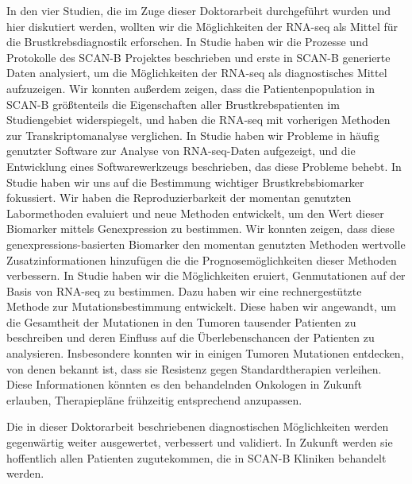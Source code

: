 \documentclass[11pt]{book}
\begin{document}
In den vier Studien, die im Zuge dieser Doktorarbeit durchgeführt wurden und hier diskutiert werden, wollten wir die Möglichkeiten der RNA-seq als Mittel für die Brustkrebsdiagnostik erforschen. In Studie \I haben wir die Prozesse und Protokolle des SCAN-B Projektes beschrieben und erste in SCAN-B generierte Daten analysiert, um die Möglichkeiten der RNA-seq als diagnostisches Mittel aufzuzeigen. Wir konnten außerdem zeigen, dass die Patientenpopulation in SCAN-B größtenteils die Eigenschaften aller Brustkrebspatienten im Studiengebiet widerspiegelt, und haben die RNA-seq mit vorherigen Methoden zur Transkriptomanalyse verglichen. In Studie \II haben wir Probleme in häufig genutzter Software zur Analyse von RNA-seq-Daten aufgezeigt, und die Entwicklung eines Softwarewerkzeugs beschrieben, das diese Probleme behebt. In Studie \III haben wir uns auf die Bestimmung wichtiger Brustkrebsbiomarker fokussiert. Wir haben die Reproduzierbarkeit der momentan genutzten Labormethoden evaluiert und neue Methoden entwickelt, um den Wert dieser Biomarker mittels Genexpression zu bestimmen. Wir konnten zeigen, dass diese genexpressions-basierten Biomarker den momentan genutzten Methoden wertvolle Zusatzinformationen hinzufügen die die Prognosemöglichkeiten dieser Methoden verbessern. In Studie \IV haben wir die Möglichkeiten eruiert, Genmutationen auf der Basis von RNA-seq zu bestimmen.
Dazu haben wir eine rechnergestützte Methode zur Mutationsbestimmung entwickelt. Diese haben wir angewandt, um die Gesamtheit der Mutationen in den Tumoren tausender Patienten zu beschreiben und deren Einfluss auf die Überlebenschancen der Patienten zu analysieren. Insbesondere konnten wir in einigen Tumoren Mutationen entdecken, von denen bekannt ist, dass sie Resistenz gegen Standardtherapien verleihen. Diese Informationen könnten es den behandelnden Onkologen in Zukunft erlauben, Therapiepläne frühzeitig entsprechend anzupassen.

Die in dieser Doktorarbeit beschriebenen diagnostischen Möglichkeiten werden gegenwärtig weiter ausgewertet, verbessert und validiert. In Zukunft werden sie hoffentlich allen Patienten zugutekommen, die in SCAN-B Kliniken behandelt werden.






\end{document}
